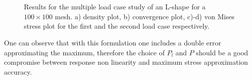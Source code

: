 \begin{figure}[ht]
\centering
{}%
\quad
{}%
  \\
  \quad
    \\
\caption{Results for the multiple load case study of an L-shape for a $100\times100$ mesh. a) density plot, b) convergence plot, c)-d) von Mises stress plot for the first and the second load case respectively. }%
\label{fig.2.22}%
\end{figure}
One can observe that with this formulation one includes a double error approximating the maximum, therefore the choice of $P_l$ and $P$ should be a good compromise between response non linearity and maximum stress approximation accuracy.
